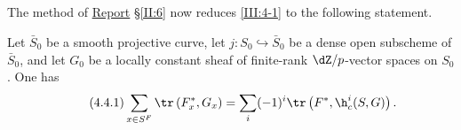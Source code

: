 \subsection{}\label{III:4-4}
The method of \hyperref[II]{Report} \S\ref{II:6} now reduces \ref{III:4-1} to the following statement.

\begin{theorem_}\label{III:4-1bis}
Let $\bar S_0$ be a smooth projective curve, let
$j:S_0\hookrightarrow \bar S_0$ be a dense open subscheme of $\bar S_0$,
and let $G_0$ be a locally constant sheaf of finite-rank $\dZ/p$-vector
spaces on $S_0$. One has
\begin{equation*}\tag{4.4.1}\label{III:eq:4-4-1}
  \sum_{x\in S^F} \tr\left(F_x^*,G_x\right) = \sum_i (-1)^i \tr\left(F^*,\h_c^i(S,G)\right) \text{.}
\end{equation*}
\end{theorem_}
